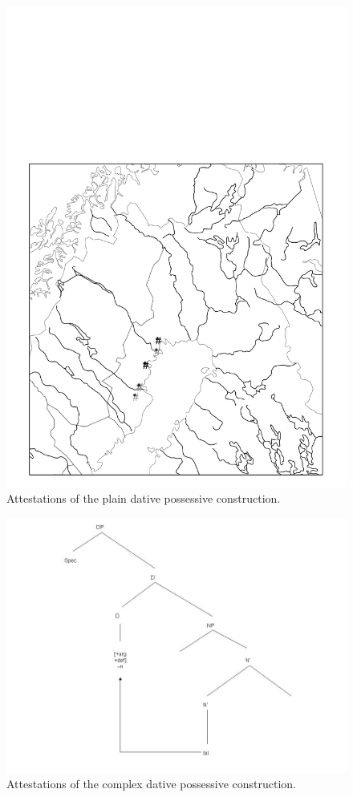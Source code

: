 \begin{figure}[h]
\includegraphics{figures_mod/image18}
\caption{Attestations of the plain dative possessive construction.}
\label{map:18}

\end{figure}

\begin{figure}[h]
\includegraphics{figures_mod/image19}
\caption{Attestations of the complex dative possessive construction.}
\label{map:19}

\end{figure}

